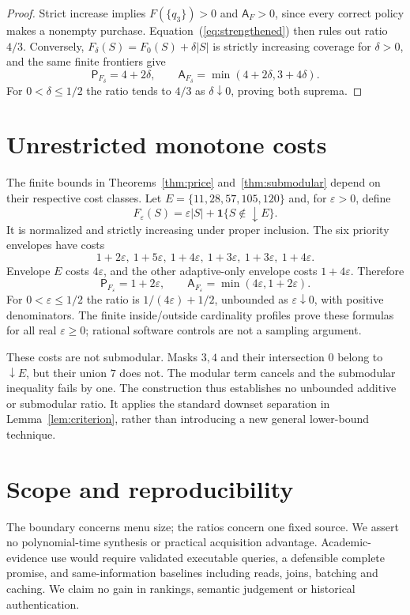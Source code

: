 \documentclass[pdflatex,sn-mathphys-num]{sn-jnl}
\newcommand{\A}{\mathsf{A}}
\newcommand{\Pcost}{\mathsf{P}}
\newcommand{\down}{\mathop{\downarrow}}
\theoremstyle{thmstyleone}
\theoremstyle{thmstylethree}
\theoremstyle{thmstyletwo}
\begin{document}
\begin{proof}
Strict increase implies $F(\{q_3\})>0$ and $\A_F>0$, since every correct policy makes a nonempty purchase. Equation~(\ref{eq:strengthened}) then rules out ratio $4/3$. Conversely, $F_\delta(S)=F_0(S)+\delta|S|$ is strictly increasing coverage for $\delta>0$, and the same finite frontiers give
\[
 \Pcost_{F_\delta}=4+2\delta,\qquad
 \A_{F_\delta}=\min(4+2\delta,3+4\delta).
\]
For $0<\delta\leq1/2$ the ratio tends to $4/3$ as $\delta\downarrow0$, proving both suprema.
\end{proof}

\section{Unrestricted monotone costs}
The finite bounds in Theorems~\ref{thm:price} and~\ref{thm:submodular} depend on their respective cost classes. Let $E=\{11,28,57,105,120\}$ and, for $\varepsilon>0$, define
\[
 F_\varepsilon(S)=\varepsilon|S|+\mathbf{1}\{S\notin\down E\}.
\]
It is normalized and strictly increasing under proper inclusion. The six priority envelopes have costs
\[
1+2\varepsilon,\ 1+5\varepsilon,\ 1+4\varepsilon,\
1+3\varepsilon,\ 1+3\varepsilon,\ 1+4\varepsilon.
\]
Envelope $E$ costs $4\varepsilon$, and the other adaptive-only envelope costs $1+4\varepsilon$. Therefore
\[
 \Pcost_{F_\varepsilon}=1+2\varepsilon,\qquad
 \A_{F_\varepsilon}=\min(4\varepsilon,1+2\varepsilon).
\]
For $0<\varepsilon\leq1/2$ the ratio is $1/(4\varepsilon)+1/2$, unbounded as $\varepsilon\downarrow0$, with positive denominators. The finite inside/outside cardinality profiles prove these formulas for all real $\varepsilon\geq0$; rational software controls are not a sampling argument.

These costs are not submodular. Masks $3,4$ and their intersection $0$ belong to $\down E$, but their union $7$ does not. The modular term cancels and the submodular inequality fails by one. The construction thus establishes no unbounded additive or submodular ratio. It applies the standard downset separation in Lemma~\ref{lem:criterion}, rather than introducing a new general lower-bound technique.

\section{Scope and reproducibility}
The boundary concerns menu size; the ratios concern one fixed source. We assert no polynomial-time synthesis or practical acquisition advantage. Academic-evidence use would require validated executable queries, a defensible complete promise, and same-information baselines including reads, joins, batching and caching. We claim no gain in rankings, semantic judgement or historical authentication.
\end{document}
